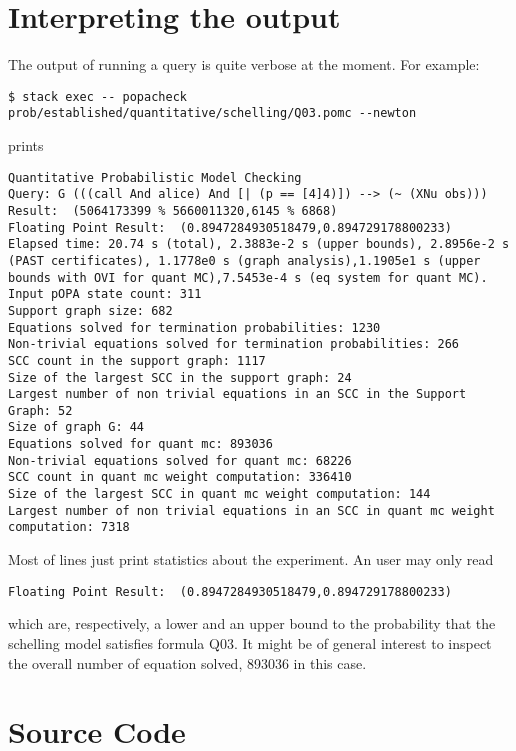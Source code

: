 \documentclass[9pt,a4paper]{article}
\begin{document}
\section{Interpreting the output}
The output of running a query is quite verbose at the moment. For example: 
\begin{verbatim}
$ stack exec -- popacheck prob/established/quantitative/schelling/Q03.pomc --newton
\end{verbatim}
prints 
\begin{verbatim}
Quantitative Probabilistic Model Checking
Query: G (((call And alice) And [| (p == [4]4)]) --> (~ (XNu obs)))
Result:  (5064173399 % 5660011320,6145 % 6868)
Floating Point Result:  (0.8947284930518479,0.894729178800233)
Elapsed time: 20.74 s (total), 2.3883e-2 s (upper bounds), 2.8956e-2 s (PAST certificates), 1.1778e0 s (graph analysis),1.1905e1 s (upper bounds with OVI for quant MC),7.5453e-4 s (eq system for quant MC).
Input pOPA state count: 311
Support graph size: 682
Equations solved for termination probabilities: 1230
Non-trivial equations solved for termination probabilities: 266
SCC count in the support graph: 1117
Size of the largest SCC in the support graph: 24
Largest number of non trivial equations in an SCC in the Support Graph: 52
Size of graph G: 44
Equations solved for quant mc: 893036
Non-trivial equations solved for quant mc: 68226
SCC count in quant mc weight computation: 336410
Size of the largest SCC in quant mc weight computation: 144
Largest number of non trivial equations in an SCC in quant mc weight computation: 7318

\end{verbatim}
Most of lines just print statistics about the experiment. An user may only read
\begin{verbatim}
Floating Point Result:  (0.8947284930518479,0.894729178800233)
\end{verbatim}
which are, respectively, a lower and an upper bound to the probability that the schelling model satisfies formula Q03. It might be of general interest to inspect the overall number of equation solved, 893036 in this case.

\section{Source Code}
\label{sec:sources}
\end{document}
